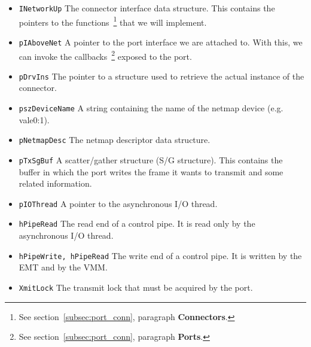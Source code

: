 \documentclass[a4paper, 12pt, titlepage]{report}
\begin{document}
\begin{itemize}
\item \texttt{INetworkUp} The connector interface data structure. This contains the pointers to the functions~\footnote{See section~\ref{subsec:port_conn}, paragraph \textbf{Connectors}.} that we will implement.
\item \texttt{pIAboveNet} A pointer to the port interface we are attached to. With this, we can invoke the callbacks~\footnote{See section~\ref{subsec:port_conn}, paragraph \textbf{Ports}.} exposed to the port.
\item \texttt{pDrvIns} The pointer to a structure used to retrieve the actual instance of the connector.
\item \texttt{pszDeviceName} A string containing the name of the netmap device (e.g. vale0:1).
\item \texttt{pNetmapDesc} The netmap descriptor data structure.
\item \texttt{pTxSgBuf} A scatter/gather structure (S/G structure). This contains the buffer in which the port writes the frame it wants to transmit and some related information.
\item \texttt{pIOThread} A pointer to the asynchronous I/O thread.
\item \texttt{hPipeRead} The read end of a control pipe. It is read only by the asynchronous I/O thread.
\item \texttt{hPipeWrite, hPipeRead} The write end of a control pipe. It is written by the EMT and by the VMM. 
\item \texttt{XmitLock} The transmit lock that must be acquired by the port.
\end{itemize}
\end{document}
